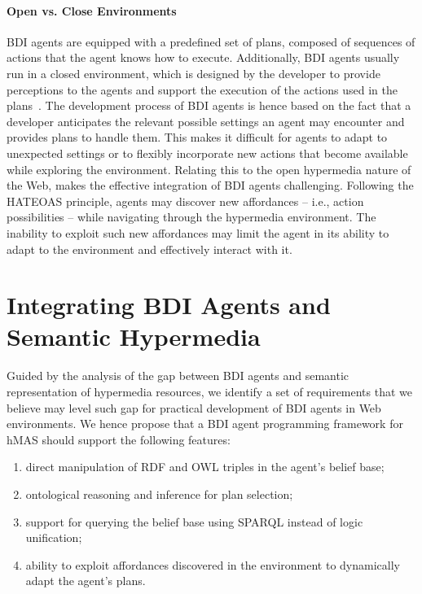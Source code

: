 \documentclass[
]{ceurart}
\begin{document}
\paragraph{Open vs. Close Environments}
\ac{BDI} agents are equipped with a predefined set of plans, composed of sequences of actions that the agent knows how to execute.
%
Additionally, \ac{BDI} agents usually run in a closed environment,
which is designed by the developer to provide perceptions to the agents and 
support the execution of the actions used in the plans~\cite{weyns2007aamas}. 
%
The development process of \ac{BDI} agents is hence based on the fact that a developer anticipates 
the relevant possible settings an agent may encounter and provides plans to handle them.
%
This makes it difficult for agents to adapt to unexpected settings or to flexibly incorporate new actions that become available while exploring the environment.
%
Relating this to the open hypermedia nature of the Web, makes the effective integration of \ac{BDI} agents challenging.
%
Following the \ac{HATEOAS} principle, agents may discover new affordances
-- i.e., action possibilities --
while navigating through the hypermedia environment.
%
The inability to exploit such new affordances may limit the agent in its ability to adapt to the environment and effectively interact with it.


\section{Integrating \acs{BDI} Agents and Semantic Hypermedia}
\label{sec:integrating-bdi-hypermedia}


Guided by the analysis of the gap between \ac{BDI} agents and semantic representation of hypermedia resources,
we identify a set of requirements that we believe may level such gap for practical development of \ac{BDI} agents in Web environments.
We hence propose that a \ac{BDI} agent programming framework for \ac{hMAS} should support the following features:
\begin{enumerate}[label={(R\arabic*)}]
  \item direct manipulation of \ac{RDF} and \ac{OWL} triples in the agent's belief base;
  \label{req:first}
  \item ontological reasoning and inference for plan selection;
  \label{req:second}
  \item support for querying the belief base using \ac{SPARQL} instead of logic unification;
  \label{req:third}
  \item ability to exploit affordances discovered in the environment to dynamically adapt the agent's plans.
  \label{req:fourth}
\end{enumerate}
\end{document}
